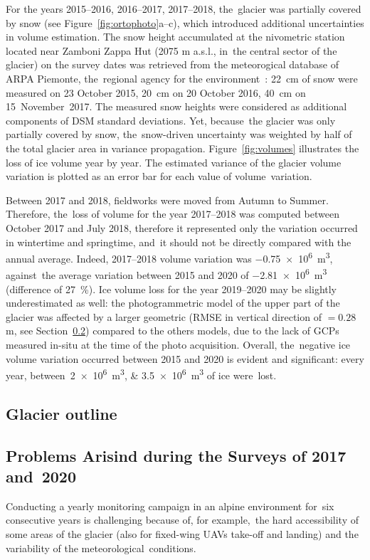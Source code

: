 For the years 2015--2016, 2016--2017, 2017--2018, the~glacier was partially covered by
snow (see Figure~\ref{fig:ortophoto}a--c), which introduced additional uncertainties in
volume estimation.
The snow height accumulated at the nivometric station located near Zamboni Zappa Hut
(2075 m a.s.l., in~the central sector of the glacier) on the survey dates was retrieved
from the meteorogical database of ARPA Piemonte, the~regional agency for the
environment~\cite{arpaPie}: \SI{22}{\centi\meter} of snow were measured on 23 October
2015, \SI{20}{\centi\meter} on 20 October 2016, \SI{40}{\centi\meter} on \mbox{15
    November 2017}.
The measured snow heights were considered as additional components of DSM standard
deviations.
Yet, because~the glacier was only partially covered by snow, the~snow-driven uncertainty
was weighted by half of the total glacier area in variance propagation.
Figure~\ref{fig:volumes} illustrates the loss of ice volume year by year.
The estimated variance of the glacier volume variation is plotted as an error bar for
each value of volume~variation.

Between 2017 and 2018, fieldworks were moved from Autumn to Summer.
Therefore, the~loss of volume for the year 2017--2018 was computed between October 2017
and July 2018, therefore it represented only the variation occurred in wintertime and
springtime, and~it should not be directly compared with the annual average.
Indeed, 2017--2018 volume variation was \SI{-0.75e6}{\cubic\meter}, against~the average
variation between 2015 and 2020 of \SI{-2.81e6}{\cubic\meter} (difference of
\SI{27}{\percent}).
Ice volume loss for the year 2019--2020 may be slightly underestimated as well: the
photogrammetric model of the upper part of the glacier was affected by a larger geometric
(RMSE in vertical direction of $ = 0.28 $ \si{\meter}, see Section~\ref{sec:problems})
compared to the others models, due to the lack of GCPs measured in-situ at the time of
the photo acquisition.
Overall, the~negative ice volume variation occurred between 2015 and 2020 is evident and
significant: every year, between~\SIlist{2e6;3.5e6}{\cubic\meter} of ice were~lost.

\subsection{Glacier outline}

\subsection{Problems Arisind during the Surveys of 2017 and~2020} \label{sec:problems}
Conducting a yearly monitoring campaign in an alpine environment for~six consecutive
years is challenging because of, for example,~the hard accessibility of some areas of the
glacier (also for fixed-wing UAVs take-off and landing) and the variability of the
meteorological~conditions.

